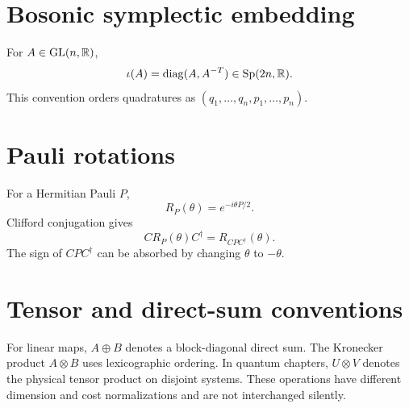 \section{Bosonic symplectic embedding}
For $A\in\operatorname{GL}(n,\mathbb R)$,
\[
\iota(A)=\operatorname{diag}(A,A^{-T})\in\operatorname{Sp}(2n,\mathbb R).
\]
This convention orders quadratures as $(q_1,\ldots,q_n,p_1,\ldots,p_n)$.

\section{Pauli rotations}
For a Hermitian Pauli $P$,
\[
R_P(\theta)=e^{-i\theta P/2}.
\]
Clifford conjugation gives
\[
C R_P(\theta) C^\dagger=R_{CPC^\dagger}(\theta).
\]
The sign of $CPC^\dagger$ can be absorbed by changing $\theta$ to $-\theta$.

\section{Tensor and direct-sum conventions}
For linear maps, $A\oplus B$ denotes a block-diagonal direct sum.  The Kronecker product $A\otimes B$ uses lexicographic ordering.  In quantum chapters, $U\otimes V$ denotes the physical tensor product on disjoint systems.  These operations have different dimension and cost normalizations and are not interchanged silently.
